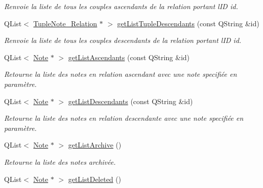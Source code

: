 \begin{DoxyCompactItemize}
\begin{DoxyCompactList}\small\item\em Renvoie la liste de tous les couples ascendants de la relation portant l\textquotesingle{}ID id. \end{DoxyCompactList}\item 
Q\+List$<$ \hyperlink{class_tuple_note___relation}{Tuple\+Note\+\_\+\+Relation} $\ast$ $>$ \hyperlink{class_notes_manager_a4b8636fd8bc9d750d778585d3e4372cf}{get\+List\+Tuple\+Descendants} (const Q\+String \&id)
\begin{DoxyCompactList}\small\item\em Renvoie la liste de tous les couples descendants de la relation portant l\textquotesingle{}ID id. \end{DoxyCompactList}\item 
Q\+List$<$ \hyperlink{class_note}{Note} $\ast$ $>$ \hyperlink{class_notes_manager_ac85019776c1e8653665e24abc9d8001d}{get\+List\+Ascendants} (const Q\+String \&id)
\begin{DoxyCompactList}\small\item\em Retourne la liste des notes en relation ascendant avec une note specifiée en paramètre. \end{DoxyCompactList}\item 
Q\+List$<$ \hyperlink{class_note}{Note} $\ast$ $>$ \hyperlink{class_notes_manager_a2ed035544b433b9cddfc83fb4c081a65}{get\+List\+Descendants} (const Q\+String \&id)
\begin{DoxyCompactList}\small\item\em Retourne la liste des notes en relation descendante avec une note specifiée en paramètre. \end{DoxyCompactList}\item 
\mbox{\label{class_notes_manager_a81aee1d57c39232f870199acb356fc57}} 
Q\+List$<$ \hyperlink{class_note}{Note} $\ast$ $>$ \hyperlink{class_notes_manager_a81aee1d57c39232f870199acb356fc57}{get\+List\+Archive} ()
\begin{DoxyCompactList}\small\item\em Retourne la liste des notes archivée. \end{DoxyCompactList}\item 
\mbox{\label{class_notes_manager_ae6b144ba1bc14b895be36b194a2e768e}} 
Q\+List$<$ \hyperlink{class_note}{Note} $\ast$ $>$ \hyperlink{class_notes_manager_ae6b144ba1bc14b895be36b194a2e768e}{get\+List\+Deleted} ()

\end{DoxyCompactItemize}
